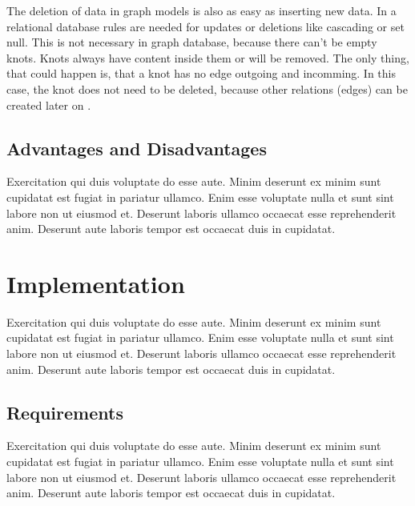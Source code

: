 The deletion of data in graph models is also as easy as inserting new data. In a relational database rules are needed for updates or deletions like cascading or set null. This is not necessary in graph database, because there can't be empty knots. Knots always have content inside them or will be removed. The only thing, that could happen is, that a knot has no edge outgoing and incomming. In this case, the knot
does not need to be deleted, because other relations (edges) can be created later on \parencite{graphmodelneo4j}.

\subsection{Advantages and Disadvantages} \label{subsec:advantagesDisadvantagesNeo4j}

Exercitation qui duis voluptate do esse aute. Minim deserunt ex minim sunt cupidatat est fugiat in pariatur ullamco. Enim esse voluptate nulla et sunt sint labore non ut eiusmod et. Deserunt laboris ullamco occaecat esse reprehenderit anim. Deserunt aute laboris tempor est occaecat duis in cupidatat.


\section{Implementation} \label{sec:implementationNeo4j}

Exercitation qui duis voluptate do esse aute. Minim deserunt ex minim sunt cupidatat est fugiat in pariatur ullamco. Enim esse voluptate nulla et sunt sint labore non ut eiusmod et. Deserunt laboris ullamco occaecat esse reprehenderit anim. Deserunt aute laboris tempor est occaecat duis in cupidatat.

\subsection{Requirements} \label{subsec:requirementsNeo4j}

Exercitation qui duis voluptate do esse aute. Minim deserunt ex minim sunt cupidatat est fugiat in pariatur ullamco. Enim esse voluptate nulla et sunt sint labore non ut eiusmod et. Deserunt laboris ullamco occaecat esse reprehenderit anim. Deserunt aute laboris tempor est occaecat duis in cupidatat.

